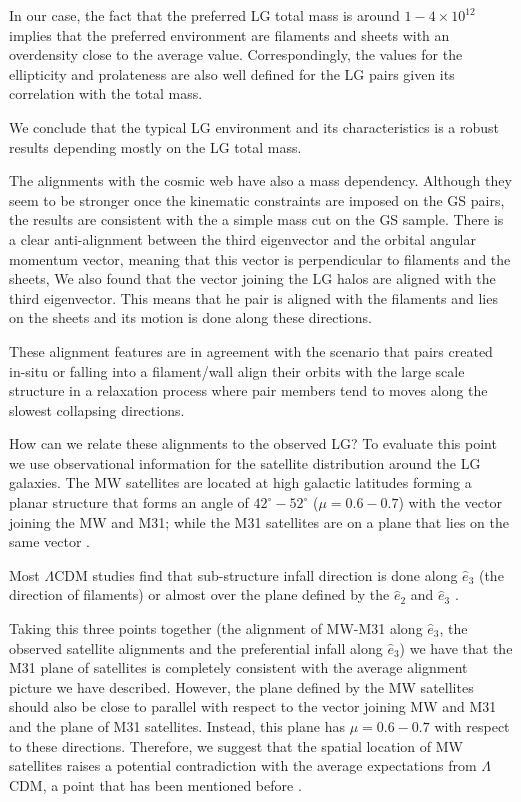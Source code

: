 \documentclass{emulateapj}
\newcommand{\Msun}{{\ifmmode{{\rm {M_{\odot}}}}\else{${\rm{M_{\odot}}}$}\fi}}
\begin{document}
In our case, the fact that the preferred LG total mass is around
$1-4\times 10^{12}$\Msun $\,$implies that the preferred environment are
filaments and sheets with an overdensity close to the average
value. 
Correspondingly, the values for the ellipticity and prolateness are
also well defined for the LG pairs given its correlation with the
total mass.

We conclude that the typical LG environment and its characteristics is
a robust results depending mostly on the LG total mass.

The alignments with the cosmic web have also a mass
dependency. Although they seem to be stronger once the kinematic constraints
are imposed on the GS pairs, the results are consistent with the
a simple mass cut on the GS sample. There is a clear anti-alignment between
the third eigenvector and the orbital angular momentum vector, meaning
that this vector is perpendicular to filaments and the sheets,  We
also found that the vector joining the LG halos are aligned with the
third eigenvector. This means that he pair is aligned with the filaments and
lies on the sheets and its motion is done along these directions. 

These alignment features are in agreement with the scenario that pairs 
created in-situ or falling into a filament/wall align their orbits with 
the large scale structure in a relaxation process where pair members
tend to moves along the slowest collapsing directions.

How can we relate these alignments to the observed LG? 
To evaluate this point we use observational information for the
satellite distribution around the LG galaxies.  The MW satellites are
located at high galactic latitudes forming a planar structure that
forms an angle of $42^{\circ}-52^{\circ}$ ($\mu=0.6-0.7$) with the
vector joining the MW and M31; while the M31 satellites are on a plane
that lies on the same vector \citep{Pawlowski2013,Shaya2013}. 

Most $\Lambda$CDM studies find that sub-structure infall direction is
done along $\hat{e}_{3}$ (the direction of filaments)
\citep{2005ApJ...629..219Z,2008MNRAS.390.1133B} or almost over the plane
defined by the $\hat{e}_2$ and $\hat{e}_3$ \citep{2014MNRAS.443.1274L}.  

Taking this three points together (the alignment of MW-M31 along
$\hat{e}_3$, the observed satellite alignments and the preferential
infall along $\hat{e}_3$) we have that the M31 plane of satellites is
completely consistent with the average alignment picture we have
described. However, the plane defined by the MW satellites should
also be close to parallel with respect to the vector joining MW and
M31 and the plane of M31 satellites. Instead, this plane has
$\mu=0.6-0.7$ with respect to these directions. Therefore, we suggest
that the spatial location of MW satellites raises a potential
contradiction with the average expectations from $\Lambda$CDM, a point
that has been mentioned before \citep{Pawlowski2012,Pawlowski2014}.  
\end{document}
